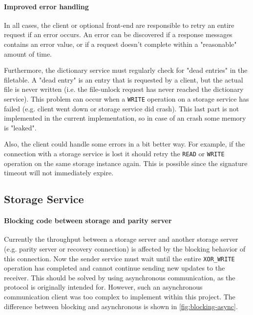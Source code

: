 \documentclass[12pt,a4paper]{scrartcl}
\begin{document}
\paragraph{Improved error handling}
In all cases, the client or optional front-end are responsible to retry an entire request if an error occurs. An error can be discovered if a response messages contains an error value, or if a request doesn't complete within a "reasonable" amount of time.

Furthermore, the dictionary service must regularly check for "dead entries" in the filetable. A "dead entry" is an entry that is requested by a client, but the actual file is never written (i.e. the file-unlock request has never reached the dictionary service). This problem can occur when a \verb|WRITE| operation on a storage service has failed (e.g. client went down or storage service did crash). This last part is not implemented in the current implementation, so in case of an crash some memory is "leaked".

Also, the client could handle some errors in a bit better way. For example, if the connection with a storage service is lost it should retry the \verb|READ| or \verb|WRITE| operation on the same storage instance again. This is possible since the signature timeout will not immediately expire.

\subsection{Storage Service}
\paragraph{Blocking code between storage and parity server}
Currently the throughput between a storage server and another storage server (e.g. parity server or recovery connection) is affected by the blocking behavior of this connection. Now the sender service must wait until the entire \verb|XOR_WRITE| operation has completed and cannot continue sending new updates to the receiver. This should be solved by using asynchronous communication, as the protocol is originally intended for. However, such an asynchronous communication client was too complex to implement within this project. The difference between blocking and asynchronous is shown in \autoref{fig:blocking-async}.
\end{document}
